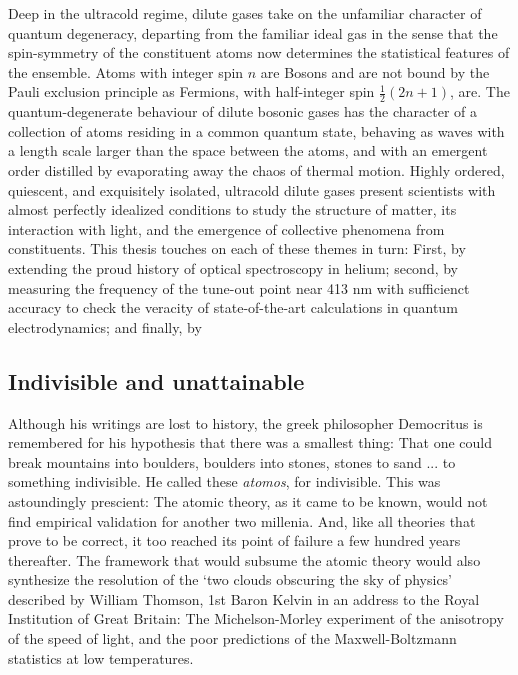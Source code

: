 	Deep in the ultracold regime, dilute gases take on the unfamiliar character of quantum degeneracy, departing from the familiar ideal gas in the sense that the spin-symmetry of the constituent atoms now determines the statistical features of the ensemble. Atoms with integer spin $n$ are Bosons and are not bound by the Pauli exclusion principle as Fermions, with half-integer spin $\frac{1}{2}(2n+1)$, are. The quantum-degenerate behaviour of dilute bosonic gases has the character of a collection of atoms residing in a common quantum state, behaving as waves with a length scale larger than the space between the atoms, and with an emergent order distilled by evaporating away the chaos of thermal motion. Highly ordered, quiescent, and exquisitely isolated, ultracold dilute gases present scientists with almost perfectly idealized conditions to study the structure of matter, its interaction with light, and the emergence of collective phenomena from constituents. This thesis touches on each of these themes in turn: First, by extending the proud history of optical spectroscopy in helium; second, by measuring the frequency of the tune-out point near 413 nm with sufficienct accuracy to check the veracity of state-of-the-art calculations in quantum electrodynamics; and finally, by 

\subsection*{Indivisible and unattainable}

	Although his writings are lost to history, the greek philosopher Democritus is remembered for his hypothesis that there was a smallest thing: That one could break mountains into boulders, boulders into stones, stones to sand ... to something indivisible. He called these \emph{atomos}, for indivisible.	This was astoundingly prescient: The atomic theory, as it came to be known, would not find empirical validation for another two millenia. And, like all theories that prove to be correct, it too reached its point of failure a few hundred years thereafter. 	The framework that would subsume the atomic theory would also synthesize the resolution of the `two clouds obscuring the sky of physics' described by William Thomson, 1st Baron Kelvin in an address to the Royal Institution of Great Britain: The Michelson-Morley experiment of the anisotropy of the speed of light, and the poor predictions of the Maxwell-Boltzmann statistics at low temperatures.


